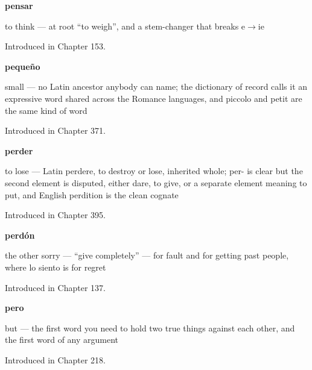 \noindent\begin{minipage}[t]{\linewidth}
\raggedright
\textbf{pensar}\par
\small to think — at root \textquotedblleft{}to weigh\textquotedblright{}, and a stem-changer that breaks e$\to$ie\par
\footnotesize Introduced in Chapter 153.
\end{minipage}\par\medskip

\noindent\begin{minipage}[t]{\linewidth}
\raggedright
\textbf{pequeño}\par
\small small — no Latin ancestor anybody can name; the dictionary of record calls it an expressive word shared across the Romance languages, and piccolo and petit are the same kind of word\par
\footnotesize Introduced in Chapter 371.
\end{minipage}\par\medskip

\noindent\begin{minipage}[t]{\linewidth}
\raggedright
\textbf{perder}\par
\small to lose — Latin perdere, to destroy or lose, inherited whole; per- is clear but the second element is disputed, either dare, to give, or a separate element meaning to put, and English perdition is the clean cognate\par
\footnotesize Introduced in Chapter 395.
\end{minipage}\par\medskip

\noindent\begin{minipage}[t]{\linewidth}
\raggedright
\textbf{perdón}\par
\small the other sorry — \textquotedblleft{}give completely\textquotedblright{} — for fault and for getting past people, where lo siento is for regret\par
\footnotesize Introduced in Chapter 137.
\end{minipage}\par\medskip

\noindent\begin{minipage}[t]{\linewidth}
\raggedright
\textbf{pero}\par
\small but — the first word you need to hold two true things against each other, and the first word of any argument\par
\footnotesize Introduced in Chapter 218.
\end{minipage}\par\medskip

